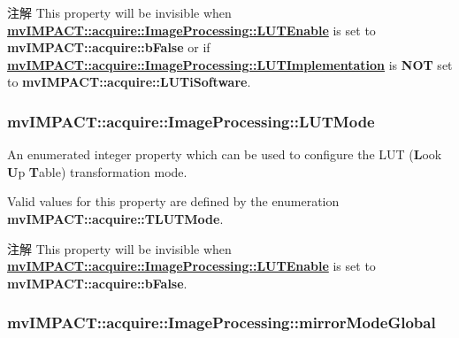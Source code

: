 \begin{DoxyNote}{注解}
This property will be invisible when {\bfseries \hyperlink{classmv_i_m_p_a_c_t_1_1acquire_1_1_image_processing_a7f8eb83578d97fde3405e6ae5d09e5c3}{mv\+I\+M\+P\+A\+C\+T\+::acquire\+::\+Image\+Processing\+::\+L\+U\+T\+Enable}} is set to {\bfseries mv\+I\+M\+P\+A\+C\+T\+::acquire\+::b\+False} or if {\bfseries \hyperlink{classmv_i_m_p_a_c_t_1_1acquire_1_1_image_processing_ab63796c1475d375fc872f0b11a102777}{mv\+I\+M\+P\+A\+C\+T\+::acquire\+::\+Image\+Processing\+::\+L\+U\+T\+Implementation}} is {\bfseries N\+O\+T} set to {\bfseries mv\+I\+M\+P\+A\+C\+T\+::acquire\+::\+L\+U\+Ti\+Software}. 
\end{DoxyNote}
\hypertarget{classmv_i_m_p_a_c_t_1_1acquire_1_1_image_processing_ae2f3059a3574e6a08a2d4348f1d5a152}{
\subsubsection[{L\+U\+T\+Mode}]{ mv\+I\+M\+P\+A\+C\+T\+::acquire\+::\+Image\+Processing\+::\+L\+U\+T\+Mode}}\label{classmv_i_m_p_a_c_t_1_1acquire_1_1_image_processing_ae2f3059a3574e6a08a2d4348f1d5a152}


An enumerated integer property which can be used to configure the L\+U\+T ({\bfseries L}ook {\bfseries U}p {\bfseries T}able) transformation mode. 

Valid values for this property are defined by the enumeration {\bfseries mv\+I\+M\+P\+A\+C\+T\+::acquire\+::\+T\+L\+U\+T\+Mode}.

\begin{DoxyNote}{注解}
This property will be invisible when {\bfseries \hyperlink{classmv_i_m_p_a_c_t_1_1acquire_1_1_image_processing_a7f8eb83578d97fde3405e6ae5d09e5c3}{mv\+I\+M\+P\+A\+C\+T\+::acquire\+::\+Image\+Processing\+::\+L\+U\+T\+Enable}} is set to {\bfseries mv\+I\+M\+P\+A\+C\+T\+::acquire\+::b\+False}. 
\end{DoxyNote}
\hypertarget{classmv_i_m_p_a_c_t_1_1acquire_1_1_image_processing_a00449c128b1916f1a00e1f368e0f363c}{
\subsubsection[{mirror\+Mode\+Global}]{ mv\+I\+M\+P\+A\+C\+T\+::acquire\+::\+Image\+Processing\+::mirror\+Mode\+Global}}\label{classmv_i_m_p_a_c_t_1_1acquire_1_1_image_processing_a00449c128b1916f1a00e1f368e0f363c}


